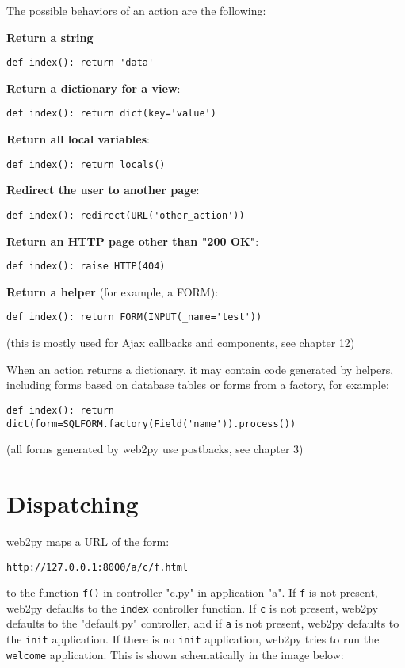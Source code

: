 \documentclass[justified,sixbynine,notoc]{tufte-book}
\def\ft{\small\tt}
\def\inxx#1{\index{#1}}
\begin{document}
\begin{fullwidth}
The possible behaviors of an action are the following:

{\bf Return a string}
\begin{lstlisting}
def index(): return 'data'
\end{lstlisting}

{\bf Return a dictionary for a view}:
\begin{lstlisting}
def index(): return dict(key='value')
\end{lstlisting}

{\bf Return all local variables}:
\begin{lstlisting}
def index(): return locals()
\end{lstlisting}

{\bf Redirect the user to another page}:
\begin{lstlisting}
def index(): redirect(URL('other_action'))
\end{lstlisting}

{\bf Return an HTTP page other than "200 OK"}:
\begin{lstlisting}
def index(): raise HTTP(404)
\end{lstlisting}

{\bf Return a helper} (for example, a FORM):
\begin{lstlisting}
def index(): return FORM(INPUT(_name='test'))
\end{lstlisting}
(this is mostly used for Ajax callbacks and components, see chapter 12)

When an action returns a dictionary, it may contain code generated by helpers, including forms based on database tables or forms from a factory, for example:

\begin{lstlisting}
def index(): return dict(form=SQLFORM.factory(Field('name')).process())
\end{lstlisting}
(all forms generated by web2py use postbacks, see chapter 3)

\goodbreak\section{Dispatching}

\inxx{url mapping} \inxx{dispatching}
\noindent web2py maps a URL of the form:

\begin{lstlisting}[keywords={}]
http://127.0.0.1:8000/a/c/f.html
\end{lstlisting}
\noindent to the function {\ft f()} in controller "c.py" in application "a". If {\ft f} is not present, web2py defaults to the {\ft index} controller function. If {\ft c} is not present, web2py defaults to the "default.py" controller, and if {\ft a} is not present, web2py defaults to the {\ft init} application. If there is no {\ft init} application, web2py tries to run the {\ft welcome} application. This is shown schematically in the image below:



\end{fullwidth}
\end{document}
